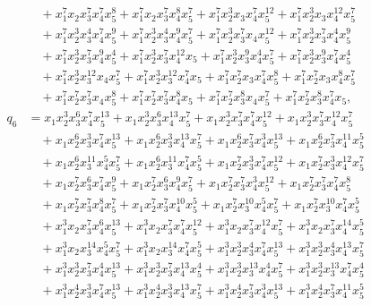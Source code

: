 \documentclass[reqno]{amsart}
\theoremstyle{plain}
\theoremstyle{definition}
\theoremstyle{plain}
\theoremstyle{definition}
\numberwithin{equation}{section}
\begin{document}
\begin{align*}
&\quad + x_1^{7}x_2x_3^{7}x_4^{7}x_5^{8} + x_1^{7}x_2x_3^{7}x_4^{8}x_5^{7} + x_1^{7}x_2^{3}x_3x_4^{7}x_5^{12} + x_1^{7}x_2^{3}x_3x_4^{12}x_5^{7}\\ 
&\quad + x_1^{7}x_2^{3}x_3^{4}x_4^{7}x_5^{9} + x_1^{7}x_2^{3}x_3^{4}x_4^{9}x_5^{7} + x_1^{7}x_2^{3}x_3^{7}x_4x_5^{12} + x_1^{7}x_2^{3}x_3^{7}x_4^{4}x_5^{9}\\ 
&\quad + x_1^{7}x_2^{3}x_3^{7}x_4^{9}x_5^{4} + x_1^{7}x_2^{3}x_3^{7}x_4^{12}x_5 + x_1^{7}x_2^{3}x_3^{9}x_4^{4}x_5^{7} + x_1^{7}x_2^{3}x_3^{9}x_4^{7}x_5^{4}\\ 
&\quad + x_1^{7}x_2^{3}x_3^{12}x_4x_5^{7} + x_1^{7}x_2^{3}x_3^{12}x_4^{7}x_5 + x_1^{7}x_2^{7}x_3x_4^{7}x_5^{8} + x_1^{7}x_2^{7}x_3x_4^{8}x_5^{7}\\ 
&\quad + x_1^{7}x_2^{7}x_3^{7}x_4x_5^{8} + x_1^{7}x_2^{7}x_3^{7}x_4^{8}x_5 + x_1^{7}x_2^{7}x_3^{8}x_4x_5^{7} + x_1^{7}x_2^{7}x_3^{8}x_4^{7}x_5,\\
q_6 & = x_1x_2^{3}x_3^{6}x_4^{7}x_5^{13} + x_1x_2^{3}x_3^{6}x_4^{13}x_5^{7} + x_1x_2^{3}x_3^{7}x_4^{7}x_5^{12} + x_1x_2^{3}x_3^{7}x_4^{12}x_5^{7}\\ 
&\quad + x_1x_2^{6}x_3^{3}x_4^{7}x_5^{13} + x_1x_2^{6}x_3^{3}x_4^{13}x_5^{7} + x_1x_2^{6}x_3^{7}x_4^{3}x_5^{13} + x_1x_2^{6}x_3^{7}x_4^{11}x_5^{5}\\ 
&\quad + x_1x_2^{6}x_3^{11}x_4^{5}x_5^{7} + x_1x_2^{6}x_3^{11}x_4^{7}x_5^{5} + x_1x_2^{7}x_3^{3}x_4^{7}x_5^{12} + x_1x_2^{7}x_3^{3}x_4^{12}x_5^{7}\\ 
&\quad + x_1x_2^{7}x_3^{6}x_4^{7}x_5^{9} + x_1x_2^{7}x_3^{6}x_4^{9}x_5^{7} + x_1x_2^{7}x_3^{7}x_4^{3}x_5^{12} + x_1x_2^{7}x_3^{7}x_4^{7}x_5^{8}\\ 
&\quad + x_1x_2^{7}x_3^{7}x_4^{8}x_5^{7} + x_1x_2^{7}x_3^{7}x_4^{10}x_5^{5} + x_1x_2^{7}x_3^{10}x_4^{5}x_5^{7} + x_1x_2^{7}x_3^{10}x_4^{7}x_5^{5}\\ 
&\quad + x_1^{3}x_2x_3^{7}x_4^{6}x_5^{13} + x_1^{3}x_2x_3^{7}x_4^{7}x_5^{12} + x_1^{3}x_2x_3^{7}x_4^{12}x_5^{7} + x_1^{3}x_2x_3^{7}x_4^{14}x_5^{5}\\ 
&\quad + x_1^{3}x_2x_3^{14}x_4^{5}x_5^{7} + x_1^{3}x_2x_3^{14}x_4^{7}x_5^{5} + x_1^{3}x_2^{3}x_3^{4}x_4^{7}x_5^{13} + x_1^{3}x_2^{3}x_3^{4}x_4^{13}x_5^{7}\\ 
&\quad + x_1^{3}x_2^{3}x_3^{7}x_4^{4}x_5^{13} + x_1^{3}x_2^{3}x_3^{7}x_4^{13}x_5^{4} + x_1^{3}x_2^{3}x_3^{13}x_4^{4}x_5^{7} + x_1^{3}x_2^{3}x_3^{13}x_4^{7}x_5^{4}\\ 
&\quad + x_1^{3}x_2^{4}x_3^{3}x_4^{7}x_5^{13} + x_1^{3}x_2^{4}x_3^{3}x_4^{13}x_5^{7} + x_1^{3}x_2^{4}x_3^{7}x_4^{3}x_5^{13} + x_1^{3}x_2^{4}x_3^{7}x_4^{11}x_5^{5}\\ 

\end{align*}
\end{document}
